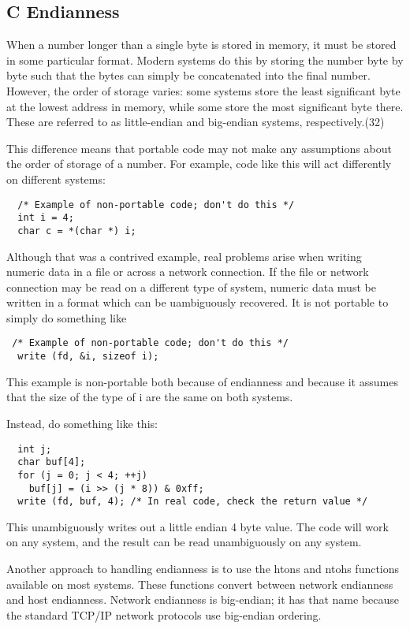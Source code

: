 \subsection{C Endianness}

When a number longer than a single byte is stored in memory, it must be stored in some particular format. Modern systems do this by storing the number byte by byte such that the bytes can simply be concatenated into the final number. However, the order of storage varies: some systems store the least significant byte at the lowest address in memory, while some store the most significant byte there. These are referred to as little-endian and big-endian systems, respectively.(32)

This difference means that portable code may not make any assumptions about the order of storage of a number. For example, code like this will act differently on different systems:

\begin{verbatim}
  /* Example of non-portable code; don't do this */
  int i = 4;
  char c = *(char *) i;
\end{verbatim}

Although that was a contrived example, real problems arise when writing numeric data in a file or across a network connection. If the file or network connection may be read on a different type of system, numeric data must be written in a format which can be uambiguously recovered. It is not portable to simply do something like

\begin{verbatim}
 /* Example of non-portable code; don't do this */
  write (fd, &i, sizeof i);
\end{verbatim}

This example is non-portable both because of endianness and because it assumes that the size of the type of i are the same on both systems.

Instead, do something like this:

\begin{verbatim}
  int j;
  char buf[4];
  for (j = 0; j < 4; ++j)
    buf[j] = (i >> (j * 8)) & 0xff;
  write (fd, buf, 4); /* In real code, check the return value */
\end{verbatim}

This unambiguously writes out a little endian 4 byte value. The code will work on any system, and the result can be read unambiguously on any system.

Another approach to handling endianness is to use the htons and ntohs functions available on most systems. These functions convert between network endianness and host endianness. Network endianness is big-endian; it has that name because the standard TCP/IP network protocols use big-endian ordering.

